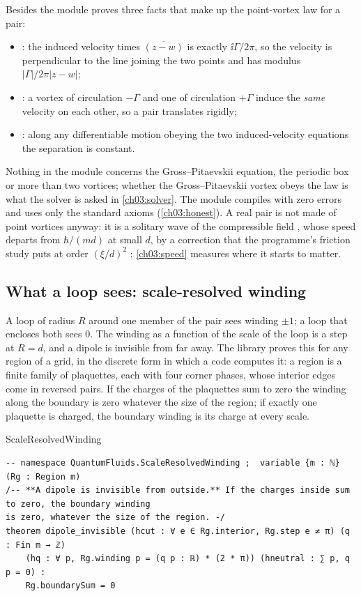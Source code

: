 Besides  the module proves three facts that make up the point-vortex law for a pair:
\begin{itemize}
\item {}: the induced velocity times $\overline{(z-w)}$ is exactly $\ii\Gamma/2\pi$, so the velocity is perpendicular to the line joining the two points and has modulus $|\Gamma|/2\pi|z-w|$;
\item {}: a vortex of circulation $-\Gamma$ and one of circulation $+\Gamma$ induce the \emph{same} velocity on each other, so a pair translates rigidly;
\item {}: along any differentiable motion obeying the two induced-velocity equations the separation is constant.
\end{itemize}
Nothing in the module concerns the Gross--Pitaevskii equation, the periodic box or more than two vortices; whether the Gross--Pitaevskii vortex obeys the law is what the solver is asked in \cref{ch03:solver}. The module compiles with zero errors and uses only the standard axioms (\cref{ch03:honest}). A real pair is not made of point vortices anyway: it is a solitary wave of the compressible field \cite{JonesRoberts1982}, whose speed departs from $\hbar/(md)$ at small $d$, by a correction that the programme's friction study puts at order $(\xi/d)^2$ \cite{Callens2026a}; \cref{ch03:speed} measures where it starts to matter.

\subsection{What a loop sees: scale-resolved winding}\label{ch03:scale}A loop of radius $R$ around one member of the pair sees winding $\pm1$; a loop that encloses both sees $0$. The winding as a function of the scale of the loop is a step at $R=d$, and a dipole is invisible from far away. The library proves this for any region of a grid, in the discrete form in which a code computes it: a region is a finite family of plaquettes, each with four corner phases, whose interior edges come in reversed pairs. If the charges of the plaquettes sum to zero the winding along the boundary is zero whatever the size of the region; if exactly one plaquette is charged, the boundary winding is its charge at every scale.

\begin{leanbox}{ScaleResolvedWinding}
\begin{lstlisting}[style=lean,basicstyle=\ttfamily\footnotesize]
-- namespace QuantumFluids.ScaleResolvedWinding ;  variable {m : ℕ} (Rg : Region m)
/-- **A dipole is invisible from outside.** If the charges inside sum to zero, the boundary winding
is zero, whatever the size of the region. -/
theorem dipole_invisible (hcut : ∀ e ∈ Rg.interior, Rg.step e ≠ π) (q : Fin m → ℤ)
    (hq : ∀ p, Rg.winding p = (q p : ℝ) * (2 * π)) (hneutral : ∑ p, q p = 0) :
    Rg.boundarySum = 0
\end{lstlisting}
\end{leanbox}

